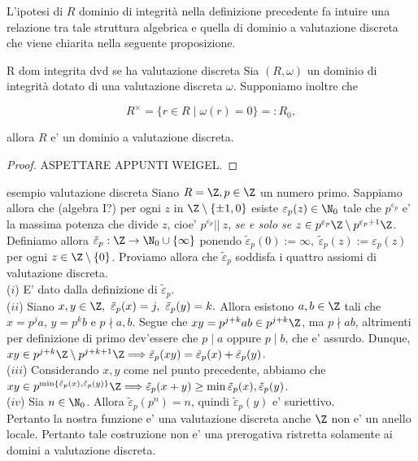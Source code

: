 \noindent L'ipotesi di $R$ dominio di integrità nella definizione precedente fa intuire una relazione tra tale struttura algebrica e quella di
dominio a valutazione discreta che viene chiarita nella seguente proposizione.

\begin{prop}[]{R dom integrita dvd se ha valutazione discreta}
  Sia $(R, \omega)$ un dominio di integrità dotato di una valutazione discreta $\omega$. Supponiamo inoltre che

  \[ R^{\times} = \big\{ r\in R \mid \omega(r) = 0 \big\} =: R_0,  \] 

  \noindent allora $R$ e' un dominio a valutazione discreta.
\end{prop}
\begin{proof}
  ASPETTARE APPUNTI WEIGEL.
\end{proof}

\begin{example}{esempio valutazione discreta}
  Siano $R = \Z, p\in \Z$ un numero primo. Sappiamo allora che (algebra I?) per ogni $z$ in $\Z \setminus \{\pm 1, 0\}$ esiste $\varepsilon_p(z) 
  \in \N_0$ tale che $p^{\varepsilon_p}$ e' la massima potenza che divide $z$, cioe' $p^{\varepsilon_p} ||\ z$, \emph{se e solo se} 
  $z \in p^{\varepsilon_p}\Z \setminus p^{\varepsilon_p + 1}\Z$.\\

  \noindent Definiamo allora $\tilde{\varepsilon}_p : \Z \rightarrow \N_0 \cup \{\infty\}$ ponendo $\tilde{\varepsilon}_p(0) := \infty,\ 
  \tilde{\varepsilon}_p(z) := \varepsilon_p(z)$ per ogni $z \in \Z\setminus \{0\}$. Proviamo allora che $\tilde{\varepsilon}_p$ soddisfa i quattro
  assiomi di valutazione discreta. \\
  ($i$) E' dato dalla definizione di $\tilde{\varepsilon}_p$. \\
  \noindent ($ii$) Siano $x,y \in \Z,\ \tilde{\varepsilon}_p(x) = j,\ \tilde{\varepsilon}_p(y) = k.$ Allora esistono $a,b \in \Z$ tali che
  \mbox{$x = p^ja$}, $y = p^kb$ e $p \nmid a,b$. Segue che $xy = p^{j+k}ab \in p^{j+k}\Z$, ma $p \nmid ab$, altrimenti per definizione di primo dev'essere che
  $p \mid a$ oppure $p \mid b$, che e' assurdo. Dunque, $xy \in p^{j+k} \Z \setminus p^{j+k+1} \Z \Longrightarrow \tilde{\varepsilon}_p(xy) = 
  \tilde{\varepsilon}_p(x) + \tilde{\varepsilon}_p(y)$. \\
  \noindent ($iii$) Considerando $x, y$ come nel punto precedente, abbiamo che \\
  $xy \in p^{\min\{ \tilde{\varepsilon}_p(x), \tilde{\varepsilon}_p(y) \}}\Z
  \Longrightarrow \tilde{\varepsilon}_p(x+y) \geq \min{\tilde{\varepsilon}_p(x), \tilde{\varepsilon}_p(y)}$. \\
  \noindent ($iv$) Sia $n \in \N_0$. Allora $\tilde{\varepsilon}_p(p^n) = n$, quindi $\tilde{\varepsilon}_p(y)$ e' suriettivo.\\

  \noindent Pertanto la nostra funzione e' una valutazione discreta anche $\Z$ non e' un anello locale. Pertanto tale costruzione non e' una prerogativa
  ristretta solamente ai domini a valutazione discreta.
\end{example}

